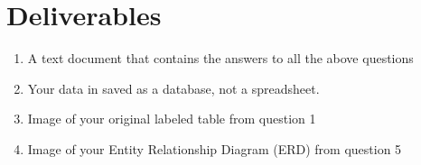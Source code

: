 \documentclass[12pt]{article}
\begin{document}
\section*{Deliverables}
\begin{enumerate}
    \item A text document that contains the answers to all the above questions 
    \item Your data in saved as a database, not a spreadsheet. 
    \item Image of your original labeled table from question 1
    \item Image of your Entity Relationship Diagram (ERD) from question 5
\end{enumerate}
\end{document}
